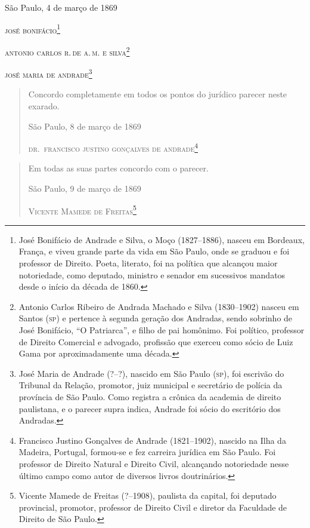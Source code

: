 \begin{flushright}
São Paulo, 4 de março de 1869

\textsc{josé bonifácio}\footnote{José Bonifácio de Andrade e Silva, o Moço
  (1827--1886), nasceu em Bordeaux, França, e viveu grande parte da vida
  em São Paulo, onde se graduou e foi professor de Direito. Poeta,
  literato, foi na política que alcançou maior notoriedade, como
  deputado, ministro e senador em sucessivos mandatos desde o início da
  década de 1860.}

\textsc{antonio carlos r.\,de a.\,m. e silva}\footnote{Antonio Carlos Ribeiro de
  Andrada Machado e Silva (1830--1902) nasceu em Santos (\textsc{sp}) e pertence à
  segunda geração dos Andradas, sendo sobrinho de José Bonifácio, ``O
  Patriarca'', e filho de pai homônimo. Foi político, professor de
  Direito Comercial e advogado, profissão que exerceu como sócio de Luiz
  Gama por aproximadamente uma década.}

\textsc{josé maria de andrade}\footnote{José Maria de Andrade (?--?),
  nascido em São Paulo (\textsc{sp}), foi escrivão do Tribunal da Relação,
  promotor, juiz municipal e secretário de polícia da província de São
  Paulo. Como registra a crônica da academia de direito paulistana, e o
  parecer supra indica, Andrade foi sócio do escritório dos Andradas.}
\end{flushright}

\begin{quote}
Concordo completamente em todos os pontos do jurídico parecer neste
exarado.

\begin{flushright}
São Paulo, 8 de março de 1869

\textsc{dr.~francisco justino gonçalves de andrade}\footnote{Francisco 
Justino Gonçalves de Andrade (1821--1902), nascido na Ilha da Madeira,
  Portugal, formou-se e fez carreira jurídica em São Paulo. Foi
  professor de Direito Natural e Direito Civil, alcançando notoriedade
  nesse último campo como autor de diversos livros doutrinários.}
  \end{flushright}
\end{quote}  

\begin{quote}
Em todas as suas partes concordo com o parecer.

\begin{flushright}
São Paulo, 9 de março de 1869

\textsc{Vicente Mamede de Freitas}\footnote{Vicente Mamede de Freitas
  (?--1908), paulista da capital, foi deputado provincial, promotor,
  professor de Direito Civil e diretor da Faculdade de Direito de São
  Paulo.}
  \end{flushright}
\end{quote}


